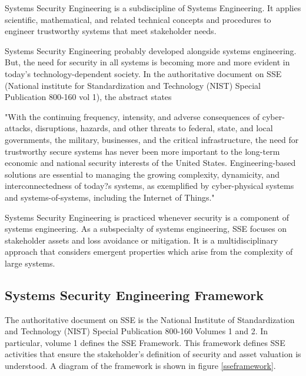 \documentclass[../../main/main.tex]{subfiles}
\begin{document}
Systems Security Engineering  is a subdiscipline of Systems Engineering.  It applies scientific, mathematical, and related technical concepts and procedures to engineer trustworthy systems that meet stakeholder needs. 

Systems Security Engineering probably developed alongside systems engineering.  But, the need for security in all systems is becoming more and more evident in today's technology-dependent society.  In the authoritative document on SSE (National institute for Standardization and Technology (NIST) Special Publication 800-160 vol 1), the abstract states

"With the continuing frequency, intensity, and adverse consequences of cyber-attacks, disruptions, hazards, and other threats to federal, state, and local governments, the military, businesses, and the critical infrastructure, the need for trustworthy secure systems has never been more important to the long-term economic and national security interests of the United States. Engineering-based solutions are essential to managing the growing complexity, dynamicity, and interconnectedness of today?s systems, as exemplified by cyber-physical systems and systems-of-systems, including the Internet of Things."

Systems Security Engineering is practiced whenever security is a component of systems engineering.  As a subspecialty of systems engineering, SSE focuses on stakeholder assets and loss avoidance or mitigation.  It is a multidisciplinary approach that considers emergent properties which arise from the complexity of large systems.
   

\subsection{Systems Security Engineering Framework}
The authoritative document on SSE is the National Institute of Standardization and Technology (NIST) Special Publication 800-160 Volumes 1 and 2.  In particular, volume 1 defines the SSE Framework.  This framework defines SSE activities that ensure the stakeholder's definition of security and asset valuation is understood.  A diagram of the framework is shown in figure \ref{sseframework}.
\end{document}
